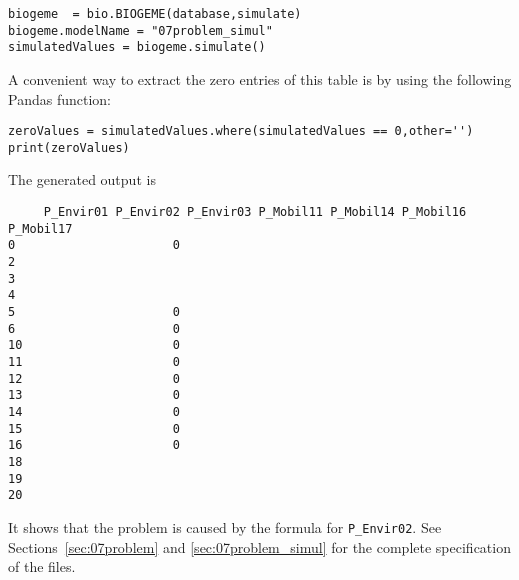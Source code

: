 \documentclass[12pt,a4paper]{article}
\begin{document}
\begin{itemize}
\begin{lstlisting}
biogeme  = bio.BIOGEME(database,simulate)
biogeme.modelName = "07problem_simul"
simulatedValues = biogeme.simulate()
  \end{lstlisting}
  A convenient way to extract the zero entries of this table is by
  using the following Pandas function:
  \begin{lstlisting}
zeroValues = simulatedValues.where(simulatedValues == 0,other='')
print(zeroValues)
  \end{lstlisting}
  The generated output is
  \begin{lstlisting}
     P_Envir01 P_Envir02 P_Envir03 P_Mobil11 P_Mobil14 P_Mobil16 P_Mobil17
0                      0
2
3
4
5                      0
6                      0
10                     0
11                     0
12                     0
13                     0
14                     0
15                     0
16                     0
18
19
20
  \end{lstlisting}
  It shows that the problem is caused by the formula for
  \lstinline+P_Envir02+. See Sections~\ref{sec:07problem}  and
  \ref{sec:07problem_simul}   for the complete specification of the
  files. 
  

\end{itemize}
\end{document}
